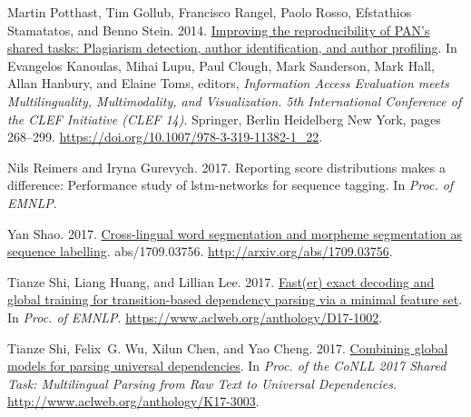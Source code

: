 \documentclass[11pt,a4paper]{article}
\begin{document}
\begin{thebibliography}{}
	Martin Potthast, Tim Gollub, Francisco Rangel, Paolo Rosso, Efstathios
	Stamatatos, and Benno Stein. 2014.
	\newblock \href{https://doi.org/10.1007/978-3-319-11382-1\_{}22}{Improving the
		reproducibility of {PAN}'s shared tasks: Plagiarism detection, author
		identification, and author profiling}.
	\newblock In Evangelos Kanoulas, Mihai Lupu, Paul Clough, Mark Sanderson, Mark
	Hall, Allan Hanbury, and Elaine Toms, editors, {\em Information Access
		Evaluation meets Multilinguality, Multimodality, and Visualization. 5th
		International Conference of the {CLEF} Initiative ({CLEF} 14)\/}. Springer,
	Berlin Heidelberg New York, pages 268--299.
	\newblock
	\href{https://doi.org/10.1007/978-3-319-11382-1\_{}22}{https://doi.org/10.1007/978-3-319-11382-1\_{}22}.
	
	Nils Reimers and Iryna Gurevych. 2017.
	\newblock Reporting score distributions makes a difference: Performance study
	of lstm-networks for sequence tagging.
	\newblock In {\em Proc. of EMNLP\/}.
	
	Yan Shao. 2017.
	\newblock \href{http://arxiv.org/abs/1709.03756}{Cross-lingual word
		segmentation and morpheme segmentation as sequence labelling}.
	 abs/1709.03756.
	\newblock
	\href{http://arxiv.org/abs/1709.03756}{http://arxiv.org/abs/1709.03756}.
	
	Tianze Shi, Liang Huang, and Lillian Lee. 2017{}.
	\newblock \href{https://www.aclweb.org/anthology/D17-1002}{Fast(er) exact
		decoding and global training for transition-based dependency parsing via a
		minimal feature set}.
	\newblock In {\em Proc. of EMNLP\/}.
	\newblock
	\href{https://www.aclweb.org/anthology/D17-1002}{https://www.aclweb.org/anthology/D17-1002}.
	
	Tianze Shi, Felix~G. Wu, Xilun Chen, and Yao Cheng. 2017{}.
	\newblock \href{http://www.aclweb.org/anthology/K17-3003}{Combining global
		models for parsing universal dependencies}.
	\newblock In {\em Proc. of the CoNLL 2017 Shared Task: Multilingual Parsing
		from Raw Text to Universal Dependencies\/}.
	\newblock
	\href{http://www.aclweb.org/anthology/K17-3003}{http://www.aclweb.org/anthology/K17-3003}.
	

\end{thebibliography}
\end{document}
